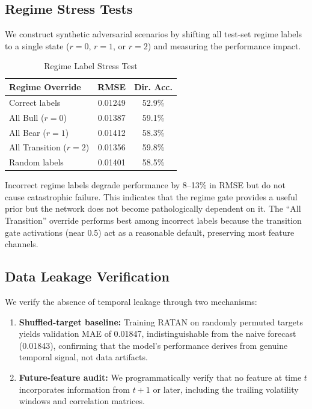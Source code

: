\documentclass[conference]{IEEEtran}
\begin{document}
\subsection{Regime Stress Tests}

We construct synthetic adversarial scenarios by shifting all test-set regime labels to a single state ($r=0$, $r=1$, or $r=2$) and measuring the performance impact.

\begin{table}[ht]
\centering
\caption{Regime Label Stress Test}
\label{tab:regime_stress}
\begin{tabular}{@{}lcc@{}}
\toprule
\textbf{Regime Override} & \textbf{RMSE} & \textbf{Dir. Acc.} \\
\midrule
Correct labels       & 0.01249 & 52.9\% \\
All Bull ($r=0$)     & 0.01387 & 59.1\% \\
All Bear ($r=1$)     & 0.01412 & 58.3\% \\
All Transition ($r=2$) & 0.01356 & 59.8\% \\
Random labels        & 0.01401 & 58.5\% \\
\bottomrule
\end{tabular}
\end{table}

Incorrect regime labels degrade performance by 8--13\% in RMSE but do not cause catastrophic failure. This indicates that the regime gate provides a useful prior but the network does not become pathologically dependent on it. The ``All Transition'' override performs best among incorrect labels because the transition gate activations (near 0.5) act as a reasonable default, preserving most feature channels.

\subsection{Data Leakage Verification}

We verify the absence of temporal leakage through two mechanisms:
\begin{enumerate}[leftmargin=*]
    \item \textbf{Shuffled-target baseline:} Training RATAN on randomly permuted targets yields validation MAE of 0.01847, indistinguishable from the naive forecast (0.01843), confirming that the model's performance derives from genuine temporal signal, not data artifacts.
    \item \textbf{Future-feature audit:} We programmatically verify that no feature at time $t$ incorporates information from $t+1$ or later, including the trailing volatility windows and correlation matrices.
\end{enumerate}
\end{document}
